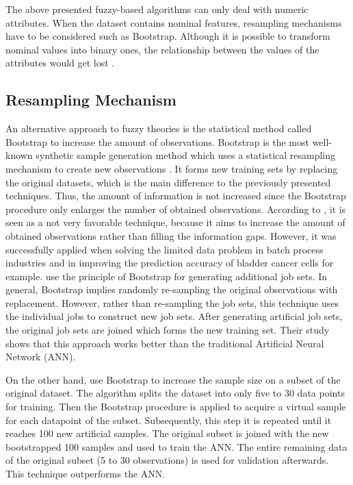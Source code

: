\documentclass[parskip=full]{scrartcl}
\begin{document}
The above presented fuzzy-based algorithms can only deal with numeric
attributes. When the dataset contains nominal features, resampling mechanisms
have to be considered such as Bootstrap. Although it is possible to transform
nominal values into binary ones, the relationship between the values of the
attributes would get lost \cite{Tsai.2008}. 

\subsection{Resampling Mechanism}

An alternative approach to fuzzy theories is the statistical method called
Bootstrap to increase the amount of observations. Bootstrap is the most
well-known synthetic sample generation method which uses a statistical
resampling mechanism to create new observations \cite{AbdulLateh.2017}. It forms
new training sets by replacing the original datasets, which is the main
difference to the previously presented techniques. Thus, the amount of
information is not increased since the Bootstrap procedure only enlarges the
number of obtained observations. According to \cite{Tsai.2015}, it is seen as a
not very favorable technique, because it aims to increase the amount of
obtained observations rather than filling the information gaps. However, it was
successfully applied when solving the limited data problem in batch process
industries \cite{Ivanescu.2006} and in improving the prediction accuracy of
bladder cancer cells \cite{Chao.2011} for example. \cite{Ivanescu.2006} use the
principle of Bootstrap for generating additional job sets. In general, Bootstrap
implies randomly re-sampling the original observations with replacement.
However, rather than re-sampling the job sets, this technique uses the
individual jobs to construct new job sets. After generating artificial job sets,
the original job sets are joined which forms the new training set. Their study
shows that this approach works better than the traditional Artificial Neural
Network (ANN).

On the other hand, \cite{Chao.2011} use Bootstrap to increase the sample size on
a subset of the original dataset. The algorithm splits the dataset into only
five to 30 data points for training. Then the Bootstrap procedure is applied to
acquire a virtual sample for each datapoint of the subset. Subsequently, this
step it is repeated until it reaches 100 new artificial samples. The original
subset is joined with the new bootstrapped 100 samples and used to train the
ANN. The entire remaining data of the original subset (5 to 30 observations) is
used for validation afterwards. This technique outperforms the ANN.
\end{document}

